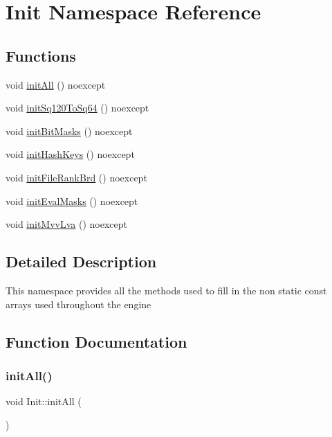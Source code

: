 \hypertarget{namespaceInit}{}\section{Init Namespace Reference}
\label{namespaceInit}
\subsection*{Functions}
\begin{DoxyCompactItemize}
\item 
void \mbox{\hyperlink{namespaceInit_a1f7b3ccd301db5369963fb7a9bd86d42}{init\+All}} () noexcept
\item 
void \mbox{\hyperlink{namespaceInit_a632a82ed6ce4587f5977a9089477d13a}{init\+Sq120\+To\+Sq64}} () noexcept
\item 
void \mbox{\hyperlink{namespaceInit_ae0ffdba0cdf68df3778883fc7d1d8a5f}{init\+Bit\+Masks}} () noexcept
\item 
void \mbox{\hyperlink{namespaceInit_a746ad8efce2e70882c0b862407056fe5}{init\+Hash\+Keys}} () noexcept
\item 
void \mbox{\hyperlink{namespaceInit_abf211e7bffeba17a44b4da8cd83dbfcd}{init\+File\+Rank\+Brd}} () noexcept
\item 
void \mbox{\hyperlink{namespaceInit_a836df13b70275ee90841a157d0e380dd}{init\+Eval\+Masks}} () noexcept
\item 
void \mbox{\hyperlink{namespaceInit_a87c48a69ce4bce6bd35619d9e9f8aee5}{init\+Mvv\+Lva}} () noexcept
\end{DoxyCompactItemize}


\subsection{Detailed Description}
This namespace provides all the methods used to fill in the non static const arrays used throughout the engine 

\subsection{Function Documentation}
\mbox{\label{namespaceInit_a1f7b3ccd301db5369963fb7a9bd86d42}} 
\subsubsection{\texorpdfstring{init\+All()}{initAll()}}
{\footnotesize\ttfamily void Init\+::init\+All (\begin{DoxyParamCaption}{ }\end{DoxyParamCaption})\hspace{0.3cm}{\ttfamily [noexcept]}}

